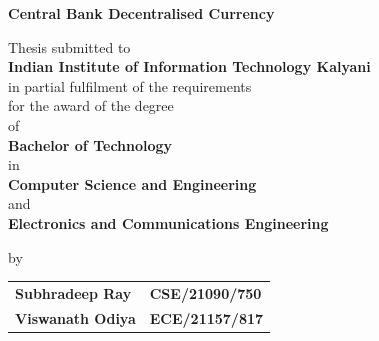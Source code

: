 \thispagestyle{empty}
\pagestyle{empty}
\vspace*{-1.75cm}
\begin{center}
  \begin{Large}
    {\textbf{Central Bank Decentralised Currency}}\\
  \end{Large}
\end{center}
\vspace{0.2cm}
\begin{center}
  \begin{large}
    Thesis  submitted to \\
    \vspace{.2cm}
    \large{\textbf{Indian Institute of Information Technology Kalyani}}\\
    \vspace{.1cm}
    in partial fulfilment of the requirements\\
    \vspace{0.1cm}
    for the award of the degree\\
    \vspace{0.3cm}
    of\\
    \vspace{0.3cm}
    \textbf{Bachelor of Technology}
    \vspace{0.3cm}
    \\in\\
    \vspace{0.1cm}
 \textbf{Computer Science and Engineering}\\and\\ \textbf{Electronics and Communications Engineering}

  \end{large}
\end{center}

\vspace{0.00cm}
\begin{center}
  \begin{large}
    by\\
    \begin{tabular}{ll}
    \vspace{0cm}
\textbf{Subhradeep Ray} & \textbf{CSE/21090/750}\\
\textbf{Viswanath Odiya} & \textbf{ECE/21157/817}
\end{tabular}
  \end{large}
\end{center}

\vspace{0.1cm}

